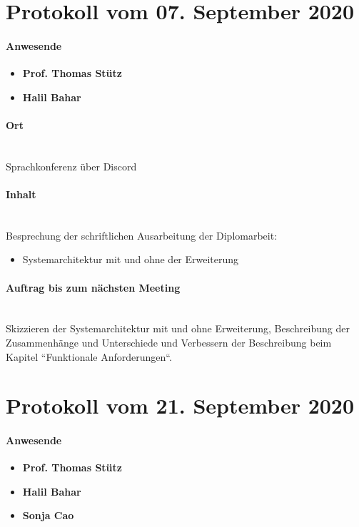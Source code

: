 \section{Protokoll vom 07. September 2020}

\paragraph{Anwesende}
\begin{itemize}
	\item{\textbf{Prof. Thomas Stütz}}
	\item{\textbf{Halil Bahar}}
\end{itemize}

\paragraph{Ort}\mbox{}\\
Sprachkonferenz über Discord

\paragraph{Inhalt}\mbox{}\\
Besprechung der schriftlichen Ausarbeitung der Diplomarbeit:
\begin{itemize}
	\item{Systemarchitektur mit und ohne der Erweiterung}
\end{itemize}

\paragraph{Auftrag bis zum nächsten Meeting}\mbox{}\\
Skizzieren der Systemarchitektur mit und ohne Erweiterung, Beschreibung der Zusammenhänge und Unterschiede und Verbessern der Beschreibung beim Kapitel ``Funktionale Anforderungen``.

\section{Protokoll vom 21. September 2020}

\paragraph{Anwesende}
\begin{itemize}
	\item{\textbf{Prof. Thomas Stütz}}
	\item{\textbf{Halil Bahar}}
	\item{\textbf{Sonja Cao}}
\end{itemize}

